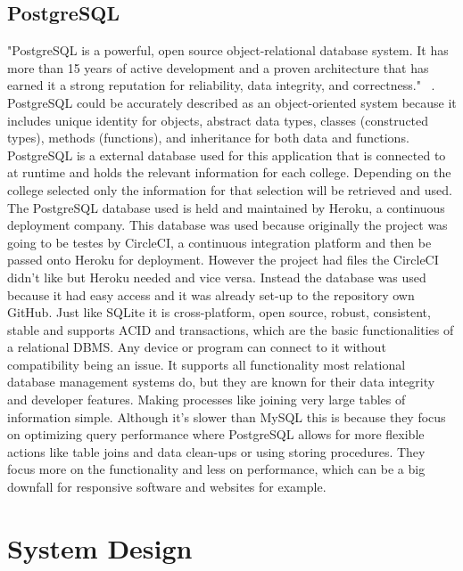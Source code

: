 \section{PostgreSQL}
"PostgreSQL is a powerful, open source object-relational database system. It has more than 15 years of active development and a proven architecture that has earned it a strong reputation for reliability, data integrity, and correctness." ~\cite{postgres}. PostgreSQL could be accurately described as an object-oriented system because it includes unique identity for objects, abstract data types, classes (constructed types), methods (functions), and inheritance for both data and functions. PostgreSQL is a external database used for this application that is connected to at runtime and holds the relevant information for each college. Depending on the college selected only the information for that selection will be retrieved and used. The PostgreSQL database used is held and maintained by Heroku, a continuous deployment company. This database was used because originally the project was going to be testes by CircleCI, a continuous integration platform and then be passed onto Heroku for deployment. However the project had files the CircleCI didn't like but Heroku needed and vice versa. Instead the database was used because it had easy access and it was already set-up to the repository own GitHub. Just like SQLite it is cross-platform, open source, robust, consistent, stable and supports ACID and transactions, which are the basic functionalities of a relational DBMS. Any device or program can connect to it without compatibility being an issue. It supports all functionality most relational database management systems do, but they are known for their data integrity and developer features. Making processes like joining very large tables of information simple. Although it's slower than MySQL this is because they focus on optimizing query performance where PostgreSQL allows for more flexible actions like table joins and data clean-ups or using storing procedures. They focus more on the functionality and less on performance, which can be a big downfall for responsive software and websites for example.

\chapter{System Design}
